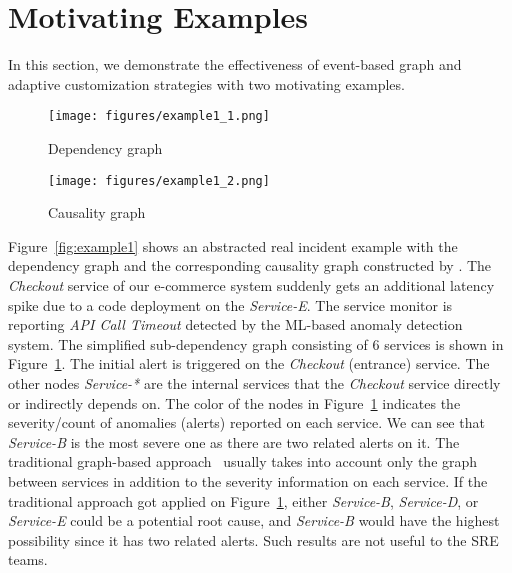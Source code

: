 \section{Motivating Examples}

\label{sec:example}

In this section, we demonstrate the effectiveness of event-based graph and adaptive customization strategies with two motivating examples.

\begin{figure*}[t]
\begin{subfigure}[b]{0.37\textwidth}
\centering
  \texttt{[image: figures/example1\_1.png]}
  \caption{Dependency graph}
  \label{fig:ex1_dep}
\end{subfigure}
\hfill %
\begin{subfigure}[b]{0.4\textwidth}
\centering
  \texttt{[image: figures/example1\_2.png]}
  \caption{Causality graph}
  \label{fig:ex1_cas}
\end{subfigure}
\caption{Motivating example of event causality graph}
\label{fig:example1}
\end{figure*}

Figure~\ref{fig:example1} shows an abstracted real incident example with the dependency graph and the corresponding causality graph constructed by \system. The \emph{Checkout} service of our e-commerce system suddenly gets an additional latency spike due to a code deployment on the \emph{Service-E}. The service monitor is reporting \emph{API Call Timeout} detected by the ML-based anomaly detection system. The simplified sub-dependency graph consisting of 6 services is shown in Figure~\ref{fig:ex1_dep}. The initial alert is triggered on the \emph{Checkout} (entrance) service. The other nodes \emph{Service-*} are the internal services that the \emph{Checkout} service directly or indirectly depends on. The color of the nodes in Figure~\ref{fig:ex1_dep} indicates the severity/count of anomalies (alerts) reported on each service. We can see that \emph{Service-B} is the most severe one as there are two related alerts on it. The traditional graph-based approach~\cite{brandon2020graph,weng2018root} usually takes into account only the graph between services in addition to the severity information on each service. If the traditional approach got applied on Figure~\ref{fig:ex1_dep}, either \emph{Service-B}, \emph{Service-D}, or \emph{Service-E} could be a potential root cause, and \emph{Service-B} would have the highest possibility since it has two related alerts. Such results are not useful to the SRE teams. 

